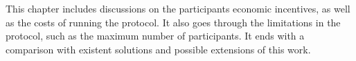 \begin{mychapterabstract}
    This chapter includes discussions on the participants economic incentives,
     as well as the costs of running the protocol. It also goes through the
     limitations in the protocol, such as the maximum number of participants.
     It ends with a comparison with existent solutions and possible extensions
     of this work.
\end{mychapterabstract}
